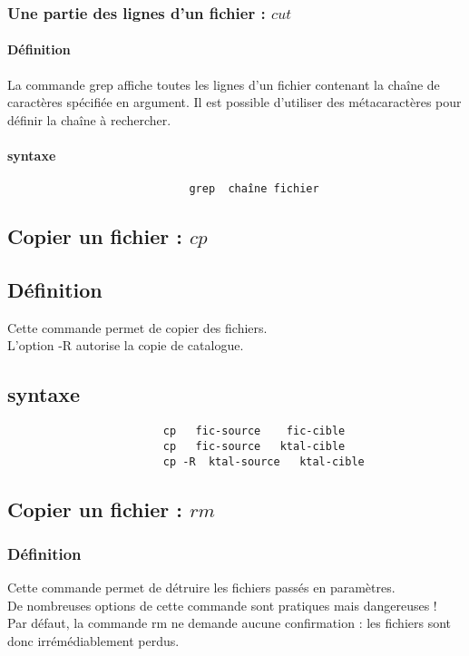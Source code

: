 				\subsubsection{Une partie des lignes d'un fichier : $cut$}
					\paragraph{Définition}			
						La commande grep affiche toutes les lignes d'un fichier contenant la chaîne de caractères spécifiée en argument.
						Il est possible d'utiliser des métacaractères  pour définir la chaîne à rechercher.
					\paragraph{syntaxe}					
						\begin{verbatim}
					 		grep  chaîne fichier
						\end{verbatim}			
			\subsection{Copier un fichier : $cp$}
				\subsection{Définition}			
					Cette commande permet de copier des fichiers.\\
					L'option -R autorise la copie de catalogue.
				\subsection{syntaxe}					
					\begin{verbatim}
						cp   fic-source    fic-cible
						cp   fic-source   ktal-cible
						cp -R  ktal-source   ktal-cible
					\end{verbatim}						
	
			\subsection{Copier un fichier : $rm$}
				\subsubsection{Définition}			
					Cette commande permet de détruire les fichiers passés en paramètres.\\
					De nombreuses options de cette commande sont pratiques mais dangereuses !\\
					Par défaut, la commande rm ne demande aucune confirmation : les fichiers sont donc irrémédiablement perdus.
